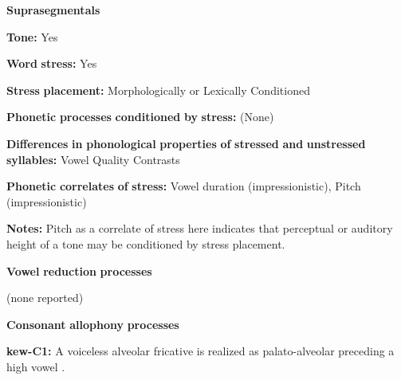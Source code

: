 \begin{styleBody}
\textbf{Suprasegmentals}
\end{styleBody}

\begin{styleBody}
\textbf{Tone:} Yes
\end{styleBody}

\begin{styleBody}
\textbf{Word} \textbf{stress:} Yes
\end{styleBody}

\begin{styleBody}
\textbf{Stress} \textbf{placement:} Morphologically or Lexically Conditioned
\end{styleBody}

\begin{styleBody}
\textbf{Phonetic} \textbf{processes} \textbf{conditioned} \textbf{by} \textbf{stress:} (None)
\end{styleBody}

\begin{styleBody}
\textbf{Differences} \textbf{in} \textbf{phonological} \textbf{properties} \textbf{of} \textbf{stressed} \textbf{and} \textbf{unstressed} \textbf{syllables:} Vowel Quality Contrasts
\end{styleBody}

\begin{styleBody}
\textbf{Phonetic} \textbf{correlates} \textbf{of} \textbf{stress:} Vowel duration (impressionistic), Pitch (impressionistic)
\end{styleBody}

\begin{styleBody}
\textbf{Notes:} Pitch as a correlate of stress here indicates that perceptual or auditory height of a tone may be conditioned by stress placement.
\end{styleBody}

\begin{styleBody}
\textbf{Vowel} \textbf{reduction} \textbf{processes}
\end{styleBody}

\begin{styleBody}
(none reported)
\end{styleBody}

\begin{styleBody}
\textbf{Consonant} \textbf{allophony} \textbf{processes}
\end{styleBody}

\begin{styleBody}
\textbf{kew-C1:} A voiceless alveolar fricative is realized as palato-alveolar preceding a high vowel \citep[24]{Franklin1971}.
\end{styleBody}

